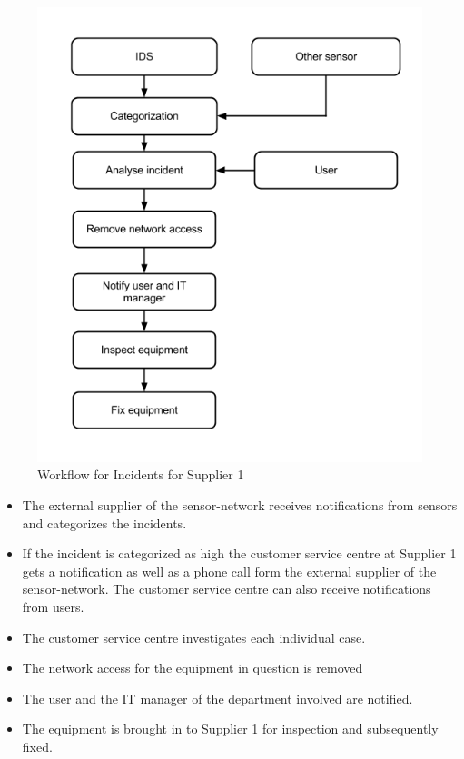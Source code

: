 \documentclass[b5paper, twoside, openright, 11pt]{report}
\begin{document}
\begin{figure}[H]
\begin{center}
\includegraphics[scale=0.54]{WorkflowCaseBSupplier1.png}
\caption[Workflow for Incidents, Case B Supplier 1]{Workflow for Incidents for Supplier 1}
\label{fig:WorkflowCaseBSupplier1}
\end{center}
\end{figure}

\begin{itemize}
\item The external supplier of the sensor-network receives notifications from sensors and categorizes the incidents.
\item If the incident is categorized as high the customer service centre at Supplier 1 gets a notification as well as a phone call form the external supplier of the sensor-network. The customer service centre can also receive notifications from users.
\item The customer service centre investigates each individual case.
\item The network access for the equipment in question is removed 
\item The user and the IT manager of the department involved are notified.
\item The equipment is brought in to Supplier 1 for inspection and subsequently fixed.
\end{itemize}
\end{document}

